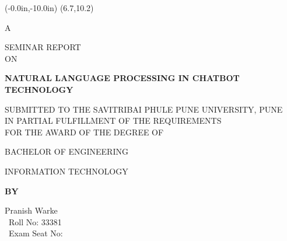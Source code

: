 \documentclass[12pt,a4paper]{report}     %
\begin{document}
\newpage
\pagestyle{plain}
\pagestyle{empty}
\pagestyle{fancy}							%
\renewcommand{\headrulewidth}{0pt}


	\thisfancyput(-0.0in,-10.0in){%
\setlength{\unitlength}{1in}\framebox(6.7,10.2)}
\begin{center}
      
      \begin{center} {A} \end{center}
      \vspace{0.2 in}
      { SEMINAR REPORT}
      \vspace{0.2 in}\\
       ON
			\end{center}
	\begin{center}
	    \vspace{0.1 in}
		\-\hspace{0.5cm}\textbf{\large  NATURAL LANGUAGE PROCESSING IN CHATBOT TECHNOLOGY  } %
		\vspace{0.2 in}
	\end{center}
     \vspace{0.2 in}
		\begin{center}
	    SUBMITTED TO THE SAVITRIBAI PHULE PUNE UNIVERSITY, PUNE \\
	    IN PARTIAL FULFILLMENT OF THE REQUIREMENTS\\
	    FOR THE AWARD OF THE DEGREE OF
	\end{center}
	\vspace{0.1 in}
	
	\begin{center}
	   {BACHELOR OF ENGINEERING}\\
	    \begin{small}{ INFORMATION TECHNOLOGY}
\end{small}	\end{center}
	\vspace{0.1 in}
	
	\begin{center}
	   \textbf{BY}
	\end{center}
	\vspace{0.1 in}
	
	\begin{center}
	   Pranish Warke\\ %
	   \  Roll No: 33381 \\    %
	   \ Exam Seat No:  \  \vspace{0.2 in}           %
	\end{center}
	\vspace{0.1 in}
	
\end{document}
